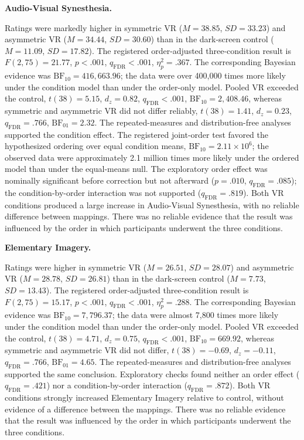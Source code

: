 \documentclass[pdflatex,sn-basic,lineno]{../sn-jnl}
\begin{document}
\medskip\noindent\textbf{Audio-Visual Synesthesia.}\nopagebreak[4]

Ratings were markedly higher in symmetric VR ($M=38.85$, $SD=33.23$) and asymmetric VR ($M=34.44$, $SD=30.60$) than in the dark-screen control ($M=11.09$, $SD=17.82$). The registered order-adjusted three-condition result is $F(2,75)=21.77$, $p<.001$, $q_{\mathrm{FDR}}<.001$, $\eta_p^2=.367$. The corresponding Bayesian evidence was $\mathrm{BF}_{10}=416{,}663.96$; the data were over 400,000 times more likely under the condition model than under the order-only model. Pooled VR exceeded the control, $t(38)=5.15$, $d_z=0.82$, $q_{\mathrm{FDR}}<.001$, $\mathrm{BF}_{10}=2{,}408.46$, whereas symmetric and asymmetric VR did not differ reliably, $t(38)=1.41$, $d_z=0.23$, $q_{\mathrm{FDR}}=.766$, $\mathrm{BF}_{01}=2.32$. The repeated-measures and distribution-free analyses supported the condition effect. The registered joint-order test favored the hypothesized ordering over equal condition means, $\mathrm{BF}_{10}=2.11\times10^6$; the observed data were approximately 2.1 million times more likely under the ordered model than under the equal-means null. The exploratory order effect was nominally significant before correction but not afterward ($p=.010$, $q_{\mathrm{FDR}}=.085$); the condition-by-order interaction was not supported ($q_{\mathrm{FDR}}=.819$). Both VR conditions produced a large increase in Audio-Visual Synesthesia, with no reliable difference between mappings. There was no reliable evidence that the result was influenced by the order in which participants underwent the three conditions.

\medskip\noindent\textbf{Elementary Imagery.}\nopagebreak[4]

Ratings were higher in symmetric VR ($M=26.51$, $SD=28.07$) and asymmetric VR ($M=28.78$, $SD=26.81$) than in the dark-screen control ($M=7.73$, $SD=13.43$). The registered order-adjusted three-condition result is $F(2,75)=15.17$, $p<.001$, $q_{\mathrm{FDR}}<.001$, $\eta_p^2=.288$. The corresponding Bayesian evidence was $\mathrm{BF}_{10}=7{,}796.37$; the data were almost 7,800 times more likely under the condition model than under the order-only model. Pooled VR exceeded the control, $t(38)=4.71$, $d_z=0.75$, $q_{\mathrm{FDR}}<.001$, $\mathrm{BF}_{10}=669.92$, whereas symmetric and asymmetric VR did not differ, $t(38)=-0.69$, $d_z=-0.11$, $q_{\mathrm{FDR}}=.766$, $\mathrm{BF}_{01}=4.65$. The repeated-measures and distribution-free analyses supported the same conclusion. Exploratory checks found neither an order effect ($q_{\mathrm{FDR}}=.421$) nor a condition-by-order interaction ($q_{\mathrm{FDR}}=.872$). Both VR conditions strongly increased Elementary Imagery relative to control, without evidence of a difference between the mappings. There was no reliable evidence that the result was influenced by the order in which participants underwent the three conditions.
\end{document}
